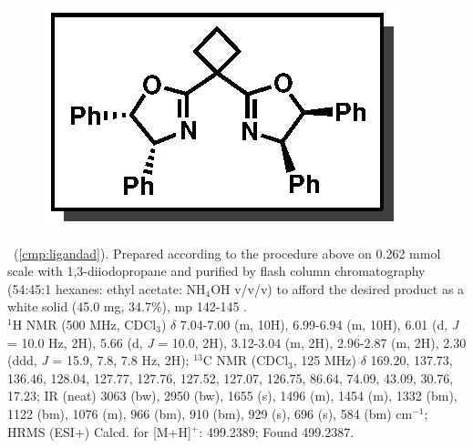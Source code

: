 \vspace{10pt}
\begin{figure}
  \vspace{-20pt}
  \begin{center}
    \includegraphics[scale=0.8]{chp_asymmetric/images/ligandad}
  \end{center}
  \vspace{-25pt}
\end{figure}
\noindent \textbf{\CMPligandad}\ (\ref{cmp:ligandad}).  Prepared according to the procedure above
on 0.262 mmol scale with 1,3-diiodopropane and purified by flash column chromatography (54:45:1
hexanes: ethyl acetate: NH$_4$OH v/v/v) to afford the desired product as a white solid (45.0 mg,
34.7\%), mp 142-145 \degc. \\
$^1$H NMR (500 MHz, CDCl$_3$) $\delta$ 7.04-7.00 (m, 10H), 6.99-6.94 (m, 10H), 6.01 (d, \textit{J} = 10.0 Hz,
2H), 5.66 (d, \textit{J} = 10.0, 2H), 3.12-3.04 (m, 2H), 2.96-2.87 (m, 2H), 2.30 (ddd, \textit{J} = 15.9, 7.8, 7.8 Hz, 2H);
$^{13}$C NMR (CDCl$_3$, 125 MHz) $\delta$ 169.20, 137.73, 136.46, 128.04, 127.77, 127.76, 127.52,
127.07, 126.75, 86.64, 74.09, 43.09, 30.76, 17.23; IR (neat) 3063 (bw), 2950 (bw), 1655 (s), 1496 (m), 1454 (m),
1332 (bm), 1122 (bm), 1076 (m), 966 (bm), 910 (bm), 929 (s), 696 (s), 584 (bm) cm$^{-1}$; HRMS
(ESI+) Calcd. for  [M+H]$^+$: 499.2389; Found 499.2387.

